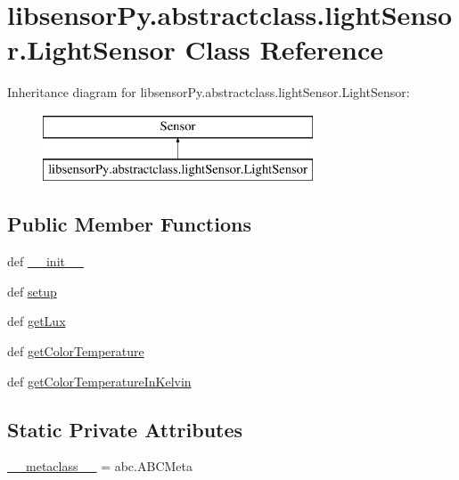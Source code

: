 \hypertarget{classlibsensorPy_1_1abstractclass_1_1lightSensor_1_1LightSensor}{}\section{libsensor\+Py.\+abstractclass.\+light\+Sensor.\+Light\+Sensor Class Reference}
\label{classlibsensorPy_1_1abstractclass_1_1lightSensor_1_1LightSensor}
Inheritance diagram for libsensor\+Py.\+abstractclass.\+light\+Sensor.\+Light\+Sensor\+:\begin{figure}[H]
\begin{center}
\leavevmode
\includegraphics[height=2.000000cm]{classlibsensorPy_1_1abstractclass_1_1lightSensor_1_1LightSensor}
\end{center}
\end{figure}
\subsection*{Public Member Functions}
\begin{DoxyCompactItemize}
\item 
def \hyperlink{classlibsensorPy_1_1abstractclass_1_1lightSensor_1_1LightSensor_a736a99134460144bb45b4ff0ac11d2b9}{\+\_\+\+\_\+init\+\_\+\+\_\+}
\item 
def \hyperlink{classlibsensorPy_1_1abstractclass_1_1lightSensor_1_1LightSensor_a7cb6e3f6a19d840f997ef7c4272eab08}{setup}
\item 
def \hyperlink{classlibsensorPy_1_1abstractclass_1_1lightSensor_1_1LightSensor_a1b717bd1dc2ead6e7ad5232eca77bbb8}{get\+Lux}
\item 
def \hyperlink{classlibsensorPy_1_1abstractclass_1_1lightSensor_1_1LightSensor_a59e3dd1073aff8fd5bc37a37cc3c47ba}{get\+Color\+Temperature}
\item 
def \hyperlink{classlibsensorPy_1_1abstractclass_1_1lightSensor_1_1LightSensor_ab8bac38c93115c683bf6eb4c59dab5a3}{get\+Color\+Temperature\+In\+Kelvin}
\end{DoxyCompactItemize}
\subsection*{Static Private Attributes}
\begin{DoxyCompactItemize}
\item 
\hyperlink{classlibsensorPy_1_1abstractclass_1_1lightSensor_1_1LightSensor_a585d16a8c9c4df31031347af0a22dac2}{\+\_\+\+\_\+metaclass\+\_\+\+\_\+} = abc.\+A\+B\+C\+Meta
\end{DoxyCompactItemize}


